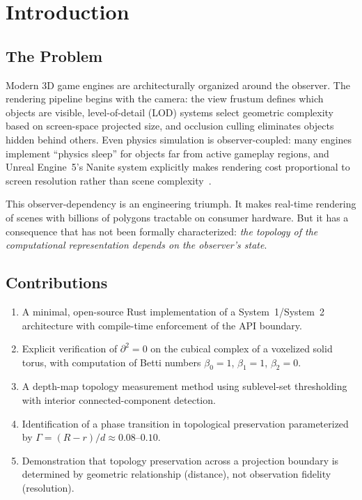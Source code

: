 \documentclass[11pt,a4paper]{article}
\theoremstyle{remark}
\begin{document}
\section{Introduction}
\label{sec:intro}

\subsection{The Problem}

Modern 3D game engines are architecturally organized around the observer. The rendering pipeline begins with the camera: the view frustum defines which objects are visible, level-of-detail (LOD) systems select geometric complexity based on screen-space projected size, and occlusion culling eliminates objects hidden behind others. Even physics simulation is observer-coupled: many engines implement ``physics sleep'' for objects far from active gameplay regions, and Unreal Engine~5's Nanite system explicitly makes rendering cost proportional to screen resolution rather than scene complexity~\cite{nanite}.

This observer-dependency is an engineering triumph. It makes real-time rendering of scenes with billions of polygons tractable on consumer hardware. But it has a consequence that has not been formally characterized: \emph{the topology of the computational representation depends on the observer's state}.

\subsection{Contributions}

\begin{enumerate}[leftmargin=*]
    \item A minimal, open-source Rust implementation of a System~1/System~2 architecture with compile-time enforcement of the API boundary.
    \item Explicit verification of $\partial^2 = 0$ on the cubical complex of a voxelized solid torus, with computation of Betti numbers $\beta_0 = 1$, $\beta_1 = 1$, $\beta_2 = 0$.
    \item A depth-map topology measurement method using sublevel-set thresholding with interior connected-component detection.
    \item Identification of a phase transition in topological preservation parameterized by $\Gamma = (R-r)/d \approx 0.08$--$0.10$.
    \item Demonstration that topology preservation across a projection boundary is determined by geometric relationship (distance), not observation fidelity (resolution).
\end{enumerate}
\end{document}
